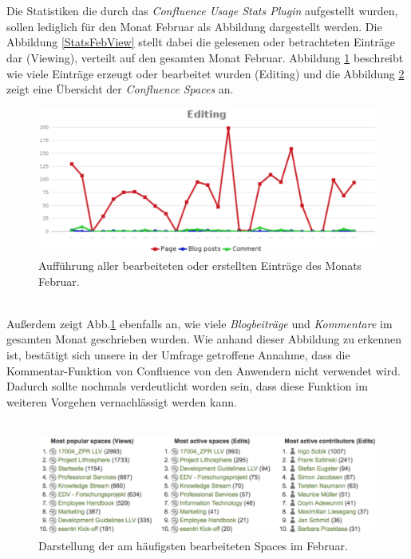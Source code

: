 \documentclass[a4paper,12pt,twoside]{scrartcl}
\begin{document}
\\\\
Die Statistiken die durch das \textit{Confluence Usage Stats Plugin} aufgestellt wurden, sollen lediglich für den Monat Februar als Abbildung dargestellt werden. Die Abbildung \ref{StatsFebView} stellt dabei die gelesenen oder betrachteten Einträge dar (Viewing), verteilt auf den gesamten Monat Februar. Abbildung \ref{StatsFebEdit} beschreibt wie viele Einträge erzeugt oder bearbeitet wurden (Editing) und die Abbildung \ref{StatsFebSpaces} zeigt eine Übersicht der \textit{Confluence Spaces} an.  
\\
\begin{figure}[h!]
\begin{center}
\includegraphics[scale = 0.6]{Bilder/StatsFebEdit.eps}
\caption{Aufführung aller bearbeiteten oder erstellten Einträge des Monats Februar.}
\label{StatsFebEdit}
\end{center}
\end{figure}
\\
Außerdem zeigt Abb.\ref{StatsFebEdit} ebenfalls an, wie viele \textit{Blogbeiträge} und \textit{Kommentare} im gesamten Monat geschrieben wurden. Wie anhand dieser Abbildung zu erkennen ist, bestätigt sich unsere in der Umfrage getroffene Annahme, dass die Kommentar-Funktion von Confluence von den Anwendern nicht verwendet wird. Dadurch sollte nochmals verdeutlicht worden sein, dass diese Funktion im weiteren Vorgehen vernachlässigt werden kann.
\\\\
\begin{figure}[h!]
\begin{center}
\includegraphics[scale = 0.5]{Bilder/StatsFebSpaces.eps}
\caption{Darstellung der am häufigsten bearbeiteten Spaces im Februar.}
\label{StatsFebSpaces}
\end{center}
\end{figure}
\end{document}
